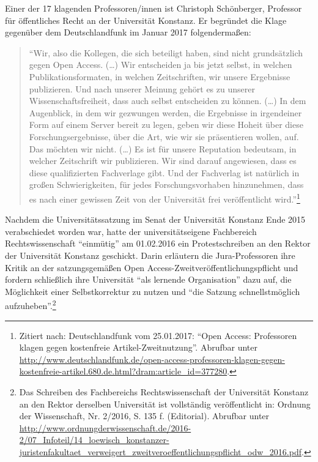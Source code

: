 \documentclass[a4paper,
fontsize=11pt,
oneside,
numbers=noperiodatend,
parskip=half-,
bibliography=totoc,
final
]{scrartcl}
\begin{document}
Einer der 17 klagenden Professoren/innen ist Christoph Schönberger,
Professor für öffentliches Recht an der Universität Konstanz. Er
begründet die Klage gegenüber dem Deutschlandfunk im Januar 2017
folgendermaßen:

\begin{quote}
\enquote{Wir, also die Kollegen, die sich beteiligt haben, sind nicht
grundsätzlich gegen Open Access. (\ldots{}) Wir entscheiden ja bis jetzt
selbst, in welchen Publikationsformaten, in welchen Zeitschriften, wir
unsere Ergebnisse publizieren. Und nach unserer Meinung gehört es zu
unserer Wissenschaftsfreiheit, dass auch selbst entscheiden zu können.
(\ldots{}) In dem Augenblick, in dem wir gezwungen werden, die
Ergebnisse in irgendeiner Form auf einem Server bereit zu legen, geben
wir diese Hoheit über diese Forschungsergebnisse, über die Art, wie wir
sie präsentieren wollen, auf. Das möchten wir nicht. (\ldots{}) Es ist
für unsere Reputation bedeutsam, in welcher Zeitschrift wir publizieren.
Wir sind darauf angewiesen, dass es diese qualifizierten Fachverlage
gibt. Und der Fachverlag ist natürlich in großen Schwierigkeiten, für
jedes Forschungsvorhaben hinzunehmen, dass es nach einer gewissen Zeit
von der Universität frei veröffentlicht wird.}\footnote{Zitiert nach:
  Deutschlandfunk vom 25.01.2017: \enquote{Open Access: Professoren
  klagen gegen kostenfreie Artikel-Zweitnutzung}. Abrufbar unter
  \url{http://www.deutschlandfunk.de/open-access-professoren-klagen-gegen-kostenfreie-artikel.680.de.html?dram:article_id=377280}.}
\end{quote}

Nachdem die Universitätssatzung im Senat der Universität Konstanz Ende
2015 verabschiedet worden war, hatte der universitätseigene Fachbereich
Rechtswissenschaft \enquote{einmütig} am 01.02.2016 ein Protestschreiben
an den Rektor der Universität Konstanz geschickt. Darin erläutern die
Jura-Professoren ihre Kritik an der satzungsgemäßen Open
Access-Zweit\-ver\-öffent\-lich\-ungs\-pflicht und fordern schließlich ihre
Universität \enquote{als lernende Organisation} dazu auf, die
Möglichkeit einer Selbstkorrektur zu nutzen und \enquote{die Satzung
schnellstmöglich aufzuheben}.\footnote{Das Schreiben des Fachbereichs
  Rechtswissenschaft der Universität Konstanz an den Rektor derselben
  Universität ist vollständig veröffentlicht in: Ordnung der
  Wissenschaft, Nr. 2/2016, S. 135 f. (Editorial). Abrufbar unter
  \url{http://www.ordnungderwissenschaft.de/2016-2/07_Infoteil/14_loewisch_konstanzer-juristenfakultaet_verweigert_zweitveroeffentlichungspflicht_odw_2016.pdf}.}
\end{document}
